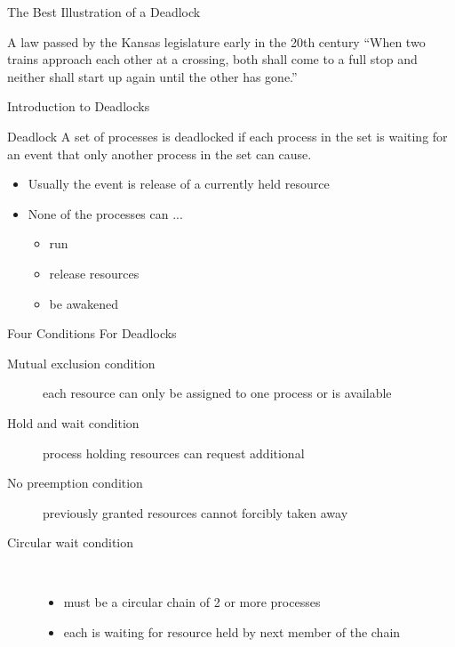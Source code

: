 \begin{frame}{The Best Illustration of a Deadlock}
  \begin{block}{A law passed by the Kansas legislature early in the 20th century}
  ``When two trains approach each other at a crossing, both shall come to a full stop and neither
  shall start up again until the other has gone.''    
  \end{block}  
\end{frame}

\begin{frame}{Introduction to Deadlocks}
  \begin{block}{Deadlock}
    A set of processes is deadlocked if each process in the set is waiting for an event
    that only another process in the set can cause.
    \begin{itemize}
    \item Usually the event is release of a currently held resource
    \item None of the processes can ...
      \begin{itemize}
      \item run
      \item release resources
      \item be awakened
      \end{itemize}
    \end{itemize}
  \end{block}
\end{frame}

\begin{frame}{Four Conditions For Deadlocks}
  \begin{description}
  \item[Mutual exclusion condition] each resource can only be assigned to one process or is available
  \item[Hold and wait condition] process holding resources can request additional
  \item[No preemption condition] previously granted resources cannot forcibly taken away
  \item[Circular wait condition] \ 
    \begin{itemize}
    \item must be a circular chain of 2 or more processes
    \item each is waiting for resource held by next member of the chain
    \end{itemize}
  \end{description}
\end{frame}

